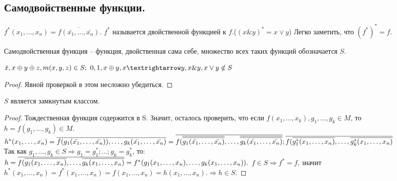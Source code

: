 \subsection{Самодвойственные функции.}
	$f^*(x_1,\ldots,x_n)=\overline{f(\bar{x_1},\ldots,\bar{x_n})}.$ $f^*$ называется двойственной функцией к $f$.($(x\&y)^*=x \vee y$)	
	Легко заметить, что $(f^*)^*=f.$
	\begin{definition}
		Самодвойственная функция -- функция, двойственная сама себе, множество всех таких функций обозначается $S$.
	\end{definition}
\begin{statement}
	$\bar{x},x\oplus y \oplus z, m(x,y,z) \in S; ~
	0,1,x\oplus y, x\textrightarrow y, x \& y, x \vee y \notin S $ 
\end{statement}
\begin{proof}
	Явной проверкой в этом несложно убедиться. 
\end{proof}	
\begin{lemma}
	$S$ является замкнутым классом.
\end{lemma}
\begin{proof}
	Тождественная функция содержится в S. Значит, осталось проверить, что если $f(x_1, \ldots,x_k), g_1, \ldots, g_k \in M$, то $h=f(g_1,\ldots,g_k) \in M $. \\
	$h^*(x_1,\ldots,x_n)=\overline{f(g_1(\bar{x_1},\ldots,\bar{x_n})),\ldots,g_k(\bar{x_1},\ldots,\bar{x_n})}=\overline{f(\overline{\overline{g_1(\bar{x_1},\ldots,\bar{x_n})}},\ldots,\overline{\overline{g_k(\bar{x_1},\ldots,\bar{x_n})}}}; \\\overline{f(\overline{g^*_{1}({x_1},\ldots,{x_n})},\ldots,\overline{g^*_k({x_1},\ldots,{x_n})}} $ \\
	Так как $g_1,\ldots,g_k \in S \Rightarrow g_1=g^*_1;\ldots;g_k=g^*_k$, то: \\
	$h=\overline{f(\overline{g_{1}({x_1},\ldots,{x_n})},\ldots,\overline{g_k({x_1},\ldots,{x_n})}}=f^*(g_1(x_1,\ldots, x_n),\ldots,g_k(x_1,\ldots,x_n)).\\ $
	$f \in S \Rightarrow f^*=f$, значит \\
	$h^*(x_1,\ldots,x_n)=f^*(x_1,\ldots,x_n)=f(x_1,\ldots,x_n)=h(x_1,\ldots,x_n). \Rightarrow h \in S.$
\end{proof}
